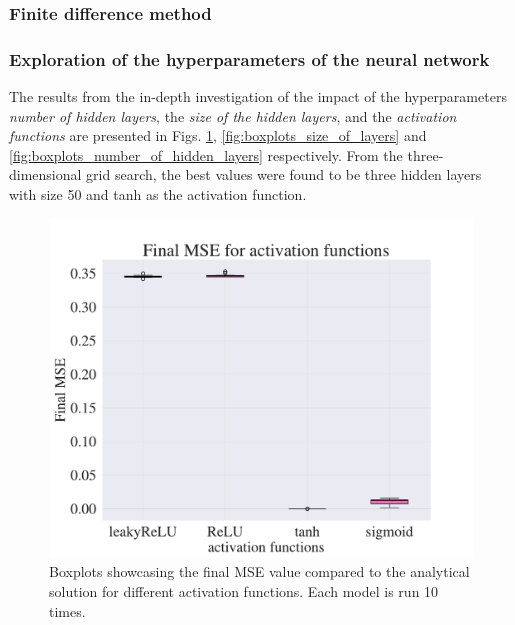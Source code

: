 \subsubsection{Finite difference method}





\subsubsection{Exploration of the hyperparameters of the neural network}

The results from the in-depth investigation of the impact of the hyperparameters \textit{number of hidden layers}, the \textit{size of the hidden layers}, and the \textit{activation functions} are presented in Figs. \ref{fig:boxplots_activations}, \ref{fig:boxplots_size_of_layers} and \ref{fig:boxplots_number_of_hidden_layers} respectively. 
From the three-dimensional grid search, the best values were found to be three hidden layers with size 50 and tanh as the activation function.


\begin{figure}[h!]
    \centering
    \includegraphics[width=1.0\linewidth]{project_3/plots/activation_search.pdf}
    \caption{Boxplots showcasing the final MSE value compared to the analytical solution for different activation functions. Each model is run 10 times.}
    \label{fig:boxplots_activations}
\end{figure}

